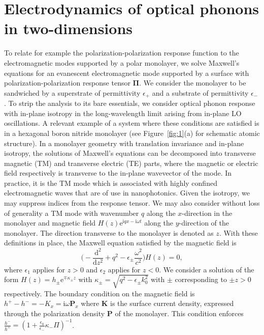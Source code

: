 \documentclass[aps,prb,twocolumn,
	           groupedaddress,superscriptaddress,
               amsfonts,amssymb,amsmath,floatfix,
	           citeautoscript]{revtex4-1}
\newcommand{\iu}{\mathrm{i}}
\newcommand{\e}{\mathrm{e}}
\newcommand{\dd}{\mathrm{d}}
\newcommand{\comment}[2]{%
    \ifbool{togglecomments}%
    {\textcolor{blue!70!black}{\small\textsf{%
    \textsuperscript{\textsc{\textsf{\MakeLowercase{#1}}}}%
    [#2]}}} %
    {}}     %
\begin{document}
\section{Electrodynamics of optical phonons in two-dimensions}
To relate for example the polarization-polarization response function  to the electromagnetic modes supported by a polar monolayer, we solve Maxwell's equations for an evanescent electromagnetic mode supported by a surface with polarization-polarization response tensor $\mathbf{\Pi}$. We consider the monolayer to be sandwiched by a superstrate of permittivity $\epsilon_+$ and a substrate of permittivity $\epsilon_-$. To strip the analysis to its bare essentials, we consider optical phonon response with in-plane isotropy in the long-wavelength limit arising from in-plane LO oscillations. A relevant example of a system where these conditions are satisfied is in a hexagonal boron nitride monolayer (see Figure~\ref{fig:1}(a) for schematic atomic structure). In a monolayer geometry with translation invariance and in-plane isotropy, the solutions of Maxwell's equations can be decomposed into transverse magnetic (TM) and transverse electric (TE) parts, where the magnetic or electric field respectively is transverse to the in-plane wavevector of the mode. In practice, it is the TM mode which is associated with highly confined electromagnetic waves that are of use in nanophotonics.  Given the isotropy, we may suppress indices from the response tensor. We may also consider without loss of generality a TM mode with wavenumber $q$ along the $x$-direction in the monolayer and magnetic field $H(z)\e^{\iu qx-\iu\omega t}$ along the $y$-direction of the monolayer. The direction transverse to the monolayer is denoted as $z$.  With these definitions in place, the Maxwell equation satisfied by the magnetic field is 
\begin{equation}\label{eq:2dmaxwell}
    \bigg(-\frac{\dd^2}{\dd{}z^2}+q^2-\epsilon_{\pm}\frac{\omega^2}{c^2} \bigg)H(z) = 0,
\end{equation}
where $\epsilon_1$ applies for $z>0$ and $\epsilon_2$ applies for $z<0$.
We consider a solution of the form $H(z) = h_\pm\e^{\mp\kappa_\pm z}$ with $\kappa_\pm = \sqrt{q^2-\epsilon_{\pm} k_0^2}$ with $\pm$ corresponding to $\pm z > 0$ respectively.  The boundary condition on the magnetic field is $h^+-h^- = -K_x = \iu\omega\mathbf{P}_x$ where $\mathbf{K}$ is the surface current density, expressed through the polarization density $\mathbf{P}$ of the monolayer.  This condition enforces $\frac{h^-}{h^+} =(1+\frac{\epsilon_0}{\epsilon_-} \kappa_-\Pi)^{-1}$. 
\end{document}
